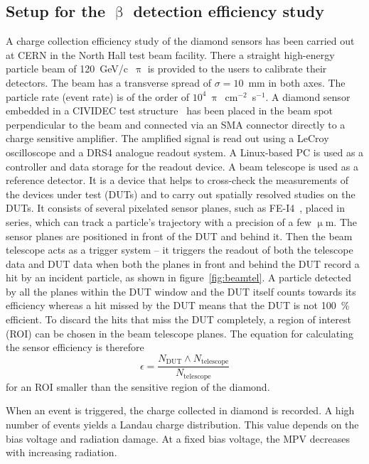 \subsection{Setup for the $\upbeta$ detection efficiency study}
\label{sec:effsetup}
A charge collection efficiency study of the diamond sensors has been carried out at CERN in the North Hall test beam facility. There a straight high-energy particle beam of 120~GeV/c~$\uppi$ is provided to the users to calibrate their detectors. The beam has a transverse spread of $\sigma=10$~mm in both axes. The particle rate (event rate) is of the order of $10^4~\uppi$~cm$^{-2}$~s$^{-1}$. A diamond sensor embedded in a CIVIDEC test structure~\cite{Cividec:00000} has been placed in the beam spot perpendicular to the beam and connected via an SMA connector directly to a charge sensitive amplifier. The amplified signal is read out using a LeCroy oscilloscope and a DRS4 analogue readout system. A Linux-based PC is used as a controller and data storage for the readout device. A beam telescope is used as a reference detector. It is a device that helps to cross-check the measurements of the devices under test (DUTs) and to carry out spatially resolved studies on the DUTs. It consists of several pixelated sensor planes, such as FE-I4~\cite{ATLIBL:00001}, placed in series, which can track a particle's trajectory with a precision of a few $\upmu$m. The sensor planes are positioned in front of the DUT and behind it. Then the beam telescope acts as a trigger system -- it triggers the readout of both the telescope data and DUT data when both the planes in front and behind the DUT record a hit by an incident particle, as shown in figure~\ref{fig:beamtel}. A particle detected by all the planes within the DUT window and the DUT itself counts towards its efficiency whereas a hit missed by the DUT means that the DUT is not 100~\% efficient. To discard the hits that miss the DUT completely, a region of interest (ROI) can be chosen in the beam telescope planes. The equation for calculating the sensor efficiency is therefore
\begin{equation}
\label{eq:sensoreff}
\epsilon = \frac{ N_\mathrm{DUT} \wedge N_\mathrm{telescope} }{ N_\mathrm{telescope} }
\end{equation}
for an ROI smaller than the sensitive region of the diamond.

When an event is triggered, the charge collected in diamond is recorded. A high number of events yields a Landau charge distribution. This value depends on the bias voltage and radiation damage. At a fixed bias voltage, the MPV decreases with increasing radiation.


